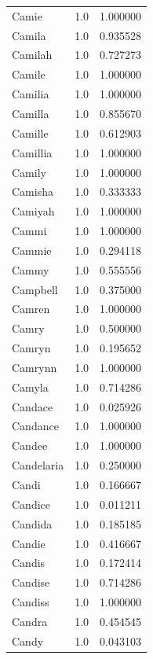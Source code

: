 \documentclass[
  letterpaper,
  DIV=11,
  numbers=noendperiod]{scrreprt}
\begin{document}
\begin{tabular}{lrr}
Camie           &   1.0 &   1.000000 \\
Camila          &   1.0 &   0.935528 \\
Camilah         &   1.0 &   0.727273 \\
Camile          &   1.0 &   1.000000 \\
Camilia         &   1.0 &   1.000000 \\
Camilla         &   1.0 &   0.855670 \\
Camille         &   1.0 &   0.612903 \\
Camillia        &   1.0 &   1.000000 \\
Camily          &   1.0 &   1.000000 \\
Camisha         &   1.0 &   0.333333 \\
Camiyah         &   1.0 &   1.000000 \\
Cammi           &   1.0 &   1.000000 \\
Cammie          &   1.0 &   0.294118 \\
Cammy           &   1.0 &   0.555556 \\
Campbell        &   1.0 &   0.375000 \\
Camren          &   1.0 &   1.000000 \\
Camry           &   1.0 &   0.500000 \\
Camryn          &   1.0 &   0.195652 \\
Camrynn         &   1.0 &   1.000000 \\
Camyla          &   1.0 &   0.714286 \\
Candace         &   1.0 &   0.025926 \\
Candance        &   1.0 &   1.000000 \\
Candee          &   1.0 &   1.000000 \\
Candelaria      &   1.0 &   0.250000 \\
Candi           &   1.0 &   0.166667 \\
Candice         &   1.0 &   0.011211 \\
Candida         &   1.0 &   0.185185 \\
Candie          &   1.0 &   0.416667 \\
Candis          &   1.0 &   0.172414 \\
Candise         &   1.0 &   0.714286 \\
Candiss         &   1.0 &   1.000000 \\
Candra          &   1.0 &   0.454545 \\
Candy           &   1.0 &   0.043103 \\

\end{tabular}
\end{document}
